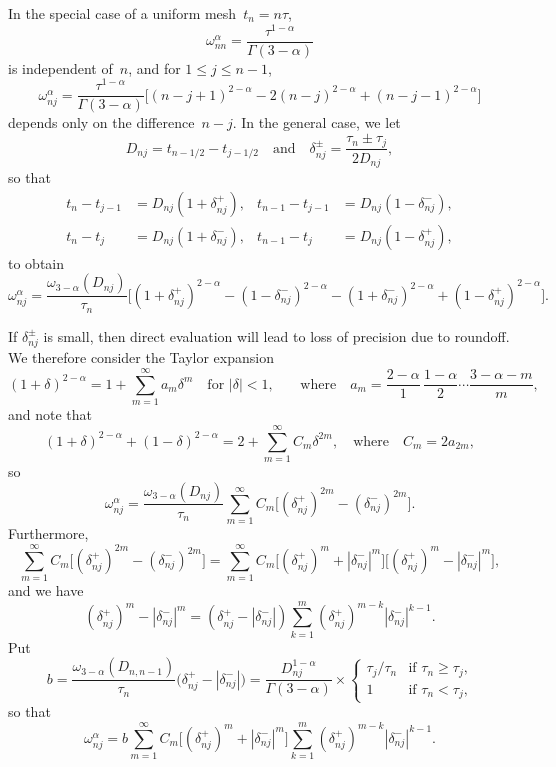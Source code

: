 \documentclass[a4paper,12pt]{article}
\begin{document}
In the special case of a uniform mesh~$t_n=n\tau$,
\[
\omega^\alpha_{nn}=\frac{\tau^{1-\alpha}}{\Gamma(3-\alpha)}
\]
is independent of~$n$, and for $1\le j\le n-1$,
\[
\omega^\alpha_{nj}=\frac{\tau^{1-\alpha}}{\Gamma(3-\alpha)}\bigl[
    (n-j+1)^{2-\alpha}-2(n-j)^{2-\alpha}+(n-j-1)^{2-\alpha}\bigr]
\]
depends only on the difference~$n-j$.  In the general case, we let
\[
D_{nj}=t_{n-1/2}-t_{j-1/2}\quad\text{and}\quad
\delta_{nj}^\pm=\frac{\tau_n\pm\tau_j}{2D_{nj}},
\]
so that
\begin{align*}
t_n-t_{j-1}&=D_{nj}(1+\delta_{nj}^+),&
t_{n-1}-t_{j-1}&=D_{nj}(1-\delta_{nj}^-),\\
t_n-t_j&=D_{nj}(1+\delta_{nj}^-),&
t_{n-1}-t_j&=D_{nj}(1-\delta_{nj}^+),
\end{align*}
to obtain
\[
\omega^\alpha_{nj}=\frac{\omega_{3-\alpha}(D_{nj})}{\tau_n}\bigl[
 (1+\delta_{nj}^+)^{2-\alpha}-(1-\delta_{nj}^-)^{2-\alpha}
-(1+\delta_{nj}^-)^{2-\alpha}+(1-\delta_{nj}^+)^{2-\alpha}\bigr].
\]

If $\delta_{nj}^\pm$ is small, then direct evaluation will lead to loss of
precision due to roundoff.  We therefore consider the Taylor expansion
\[
(1+\delta)^{2-\alpha}=1+\sum_{m=1}^\infty a_m\delta^m
\quad\text{for $|\delta|<1$,}\quad
\quad\text{where}\quad
a_m=\frac{2-\alpha}{1}\,\frac{1-\alpha}{2}\cdots\frac{3-\alpha-m}{m},
\]
and note that
\[
(1+\delta)^{2-\alpha}+(1-\delta)^{2-\alpha}
    =2+\sum_{m=1}^\infty C_m\delta^{2m},
\quad\text{where}\quad C_m=2a_{2m},
\]
so
\begin{equation}\label{eq: omega series}
\omega^\alpha_{nj}=\frac{\omega_{3-\alpha}(D_{nj})}{\tau_n}\sum_{m=1}^\infty
    C_m\bigl[(\delta_{nj}^+)^{2m}-(\delta_{nj}^-)^{2m}\bigr].
\end{equation}
Furthermore,
\[
\sum_{m=1}^\infty C_m\bigl[(\delta_{nj}^+)^{2m}-(\delta_{nj}^-)^{2m}\bigr]
    =\sum_{m=1}^\infty C_m
    \bigl[(\delta_{nj}^+)^m+|\delta_{nj}^-|^m\bigr]
    \bigl[(\delta_{nj}^+)^m-|\delta_{nj}^-|^m\bigr],
\]
and we have
\[
(\delta_{nj}^+)^m-|\delta_{nj}^-|^m=(\delta_{nj}^+-|\delta_{nj}^-|)
    \sum_{k=1}^m(\delta_{nj}^+)^{m-k}|\delta_{nj}^-|^{k-1}.
\]
Put
\[
b=\frac{\omega_{3-\alpha}(D_{n,n-1})}{\tau_n}\bigl(
    \delta_{nj}^+-|\delta_{nj}^-|\bigr)
    =\frac{D_{nj}^{1-\alpha}}{\Gamma(3-\alpha)}\times\begin{cases}
\tau_j/\tau_n&\text{if $\tau_n\ge\tau_j$,}\\
1&\text{if $\tau_n<\tau_j$,}
\end{cases}
\]
so that
\[
\omega^\alpha_{nj}=b\sum_{m=1}^\infty C_m
    \bigl[(\delta_{nj}^+)^m+|\delta_{nj}^-|^m\bigr]
    \sum_{k=1}^m(\delta_{nj}^+)^{m-k}|\delta_{nj}^-|^{k-1}.
\]
\end{document}
